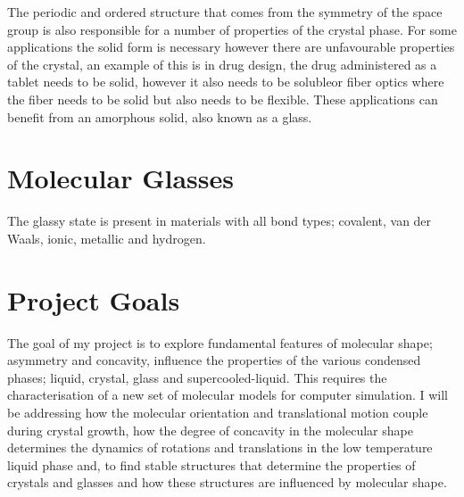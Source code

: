 The periodic and ordered structure that comes from the symmetry of the space group is also responsible for a number of properties of the crystal phase. 
For some applications the solid form is necessary however there are unfavourable properties of the crystal, an example of this is in drug design, the drug administered as a tablet needs to be solid, however it also needs to be soluble\tocite or fiber optics where the fiber needs to be solid but also needs to be flexible\tocite. These applications can benefit from an amorphous solid, also known as a glass.

\section{Molecular Glasses}

The glassy state is present in materials with all bond types; covalent, van der Waals, ionic, metallic and hydrogen\tocite.


\begin{figure}
    \caption{}
    \label{fig:entropy}
\end{figure}

\section{Project Goals}

The goal of my project is to explore fundamental features of molecular shape; asymmetry and concavity, influence the properties of the various condensed phases; liquid, crystal, glass and supercooled-liquid. This requires the characterisation of a new set of molecular models for computer simulation. I will be addressing how the molecular orientation and translational motion couple during crystal growth, how the degree of concavity in the molecular shape determines the dynamics of rotations and translations in the low temperature liquid phase and, to find stable structures that determine the properties of crystals and glasses and how these structures are influenced by molecular shape.

